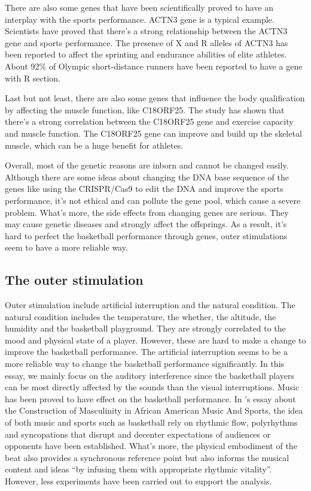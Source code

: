 \documentclass[man,floatsintext]{apa7}
\begin{document}
There are also some genes that have been scientifically proved to have an interplay with the sports performance. ACTN3 gene is a typical example. Scientists have proved that there's a strong relationship between the ACTN3 gene and sports performance. The presence of X and R alleles of ACTN3 has been reported to affect the sprinting and endurance abilities of elite athletes. About 92\% of Olympic short-distance runners have been reported to have a gene with R section.\autocite{goelACTN3AthleteGene2007}

Last but not least, there are also some genes that influence the body qualification by affecting the muscle function, like C18ORF25. The study has shown that there's a strong correlation between the C18ORF25 gene and exercise capacity and muscle function. The C18ORF25 gene can improve and build up the skeletal muscle, which can be a huge benefit for athletes.\autocite{blazevPhosphoproteomicsThreeExercise2022}

Overall, most of the genetic reasons are inborn and cannot be changed easily. Although there are some ideas about changing the DNA base sequence of the genes like using the CRISPR/Cas9 to edit the DNA and improve the sports performance, it's not ethical and can pollute the gene pool, which cause a severe problem. What's more, the side effects from changing genes are serious. They may cause genetic diseases and strongly affect the offsprings. As a result, it's hard to perfect the basketball performance through genes, outer stimulations seem to have a more reliable way. 

\subsection{The outer stimulation}
Outer stimulation include artificial interruption and the natural condition. The natural condition includes the temperature, the whether, the altitude, the humidity and the basketball playground. They are strongly correlated to the mood and physical state of a player. However, these are hard to make a change to improve the basketball performance. The artificial interruption seems to be a more reliable way to change the basketball performance significantly. In this essay, we mainly focus on the auditory interference since the basketball players can be most directly affected by the sounds than the visual interruptions. \todo{()} Music has been proved to have effect on the basketball performance. In \textcite{mcleodConstructionMasculinityAfrican2009}'s essay about the Construction of Masculinity in African American Music And Sports, the idea of both music and sports such as basketball rely on rhythmic flow, polyrhythms and syncopations that disrupt and decenter expectations of audiences or opponents have been established. What's more, the physical embodiment of the beat also provides a synchronous reference point but also informs the musical content and ideas ``by infusing them with appropriate rhythmic vitality''. However, less experiments have been carried out to support the analysis. 
\end{document}
